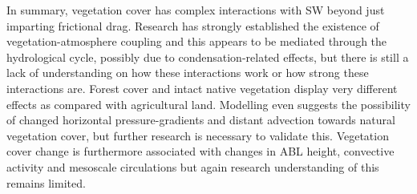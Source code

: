 In summary, vegetation cover has complex interactions with \ac{SW} beyond just imparting frictional drag. Research has strongly established the existence of vegetation-atmosphere coupling and this appears to be mediated through the hydrological cycle, possibly due to condensation-related effects, but there is still a lack of understanding on how these interactions work or how strong these interactions are. Forest cover and intact native vegetation display very different effects as compared with agricultural land. Modelling even suggests the possibility of changed horizontal pressure-gradients and distant advection towards natural vegetation cover, but further research is necessary to validate this. Vegetation cover change is furthermore associated with changes in \ac{ABL} height, convective activity and mesoscale circulations but again research understanding of this remains limited.